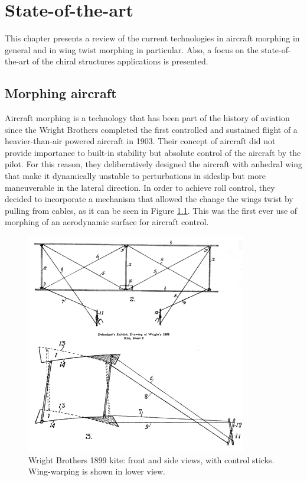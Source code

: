 \chapter{State-of-the-art} \label{chap:State_of_the_art}

This chapter presents a review of the current technologies in aircraft morphing in general and in wing twist morphing in particular. Also, a focus on the state-of-the-art of the chiral structures applications is presented.

\section{Morphing aircraft} \label{sec:Morphing_state}

  Aircraft morphing is a technology that has been part of the history of aviation since the Wright Brothers completed the first controlled and sustained flight of a heavier-than-air powered aircraft in 1903. Their concept of aircraft did not provide importance to built-in stability but absolute control of the aircraft by the pilot. For this reason, they deliberatively designed the aircraft with anhedral wing that make it dynamically unstable to perturbations in sideslip but more maneuverable in the lateral direction. In order to achieve roll control, they decided to incorporate a mechanism that allowed the change the wings twist by pulling from cables, as it can be seen in Figure \ref{fig:Wright}. This was the first ever use of morphing of an aerodynamic surface for aircraft control.

  \begin{figure}[!htpb]
    \centering
    \includegraphics[width=0.5 \textwidth]{figures/state-of-the-art/WrightBrothers1899Kite}
    \caption[Wright Brothers 1899 kite]{Wright Brothers 1899 kite: front and side views, with control sticks. Wing-warping is shown in lower view. \cite{Wright}}\label{fig:Wright}
  \end{figure}

